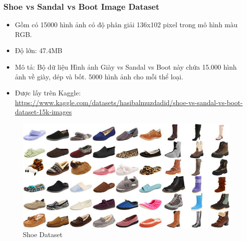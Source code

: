 \subsubsection{Shoe vs Sandal vs Boot Image Dataset}
\begin{itemize}
    \item Gồm có 15000 hình ảnh có độ phân giải 136x102 pixel trong mô hình màu RGB.
    \item Độ lớn: 47.4MB
    \item Mô tả: Bộ dữ liệu Hình ảnh Giày vs Sandal vs Boot này chứa 15.000 hình ảnh về giày, dép và bốt. 5000 hình ảnh cho mỗi thể loại. 
    \item Được lấy trên Kaggle: \href{https://www.kaggle.com/datasets/hasibalmuzdadid/shoe-vs-sandal-vs-boot-dataset-15k-images}{https://www.kaggle.com/datasets/hasibalmuzdadid/shoe-vs-sandal-vs-boot-dataset-15k-images}
\end{itemize}
\begin{center}
    \begin{figure}[!h]
        \centering
        \includegraphics[scale = 1.5]{fileanh/46.jpg}
        \caption{Shoe Dataset}
    \end{figure}
\end{center}

